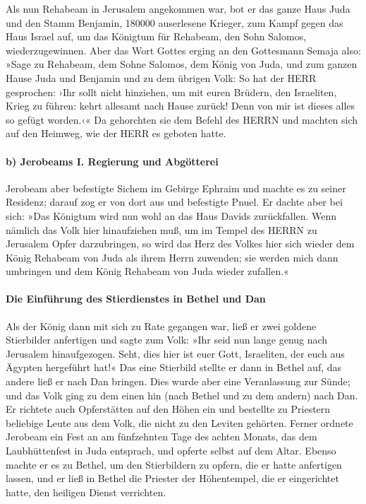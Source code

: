 Als nun Rehabeam in Jerusalem angekommen war, bot er das
ganze Haus Juda und den Stamm Benjamin, 180000 auserlesene Krieger, zum
Kampf gegen das Haus Israel auf, um das Königtum für Rehabeam, den Sohn
Salomos, wiederzugewinnen. Aber das Wort Gottes erging an
den Gottesmann Semaja also: »Sage zu Rehabeam, dem Sohne
Salomos, dem König von Juda, und zum ganzen Hause Juda und Benjamin und
zu dem übrigen Volk: So hat der HERR gesprochen: ›Ihr
sollt nicht hinziehen, um mit euren Brüdern, den Israeliten, Krieg zu
führen: kehrt allesamt nach Hause zurück! Denn von mir ist dieses alles
so gefügt worden.‹« Da gehorchten sie dem Befehl des HERRN und machten
sich auf den Heimweg, wie der HERR es geboten hatte.

\hypertarget{b-jerobeams-i.-regierung-und-abguxf6tterei}{%
\paragraph{b) Jerobeams I. Regierung und
Abgötterei}\label{b-jerobeams-i.-regierung-und-abguxf6tterei}}

Jerobeam aber befestigte Sichem im Gebirge Ephraim und
machte es zu seiner Residenz; darauf zog er von dort aus und befestigte
Pnuel. Er dachte aber bei sich: »Das Königtum wird nun
wohl an das Haus Davids zurückfallen. Wenn nämlich das
Volk hier hinaufziehen muß, um im Tempel des HERRN zu Jerusalem Opfer
darzubringen, so wird das Herz des Volkes hier sich wieder dem König
Rehabeam von Juda als ihrem Herrn zuwenden; sie werden mich dann
umbringen und dem König Rehabeam von Juda wieder zufallen.«

\hypertarget{die-einfuxfchrung-des-stierdienstes-in-bethel-und-dan}{%
\paragraph{Die Einführung des Stierdienstes in Bethel und
Dan}\label{die-einfuxfchrung-des-stierdienstes-in-bethel-und-dan}}

Als der König dann mit sich zu Rate gegangen war, ließ er
zwei goldene Stierbilder anfertigen und sagte zum Volk: »Ihr seid nun
lange genug nach Jerusalem hinaufgezogen. Seht, dies hier ist euer Gott,
Israeliten, der euch aus Ägypten hergeführt hat!« Das
eine Stierbild stellte er dann in Bethel auf, das andere ließ er nach
Dan bringen. Dies wurde aber eine Veranlassung zur Sünde;
und das Volk ging zu dem einen hin (nach Bethel und zu dem andern) nach
Dan. Er richtete auch Opferstätten auf den Höhen ein und
bestellte zu Priestern beliebige Leute aus dem Volk, die nicht zu den
Leviten gehörten. Ferner ordnete Jerobeam ein Fest an am
fünfzehnten Tage des achten Monats, das dem Laubhüttenfest in Juda
entsprach, und opferte selbst auf dem Altar. Ebenso machte er es zu
Bethel, um den Stierbildern zu opfern, die er hatte anfertigen lassen,
und er ließ in Bethel die Priester der Höhentempel, die er eingerichtet
hatte, den heiligen Dienst verrichten.

